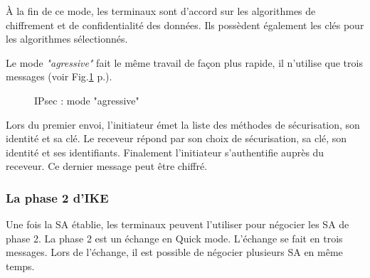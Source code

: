 À la fin de ce mode, les terminaux sont d'accord sur les algorithmes de chiffrement et de confidentialité des données. 
Ils possèdent également les clés pour les algorithmes sélectionnés. 

Le mode \textit{"agressive"} fait le même travail de façon plus rapide, il n'utilise que trois messages (voir Fig.\ref{fig:ipsagg} p.\pageref{fig:ipsagg}).
\begin{figure}[ht]
\centering
{}
\caption{IPsec : mode "agressive"}
\label{fig:ipsagg}
\end{figure} 
Lors du premier envoi, l'initiateur émet la liste des méthodes de sécurisation, son identité et sa clé. 
Le receveur répond par son choix de sécurisation, sa clé, son identité et ses identifiants. 
Finalement l'initiateur s'authentifie auprès du receveur. 
Ce dernier message peut être chiffré.
\subsubsection{La phase 2 d'IKE}
Une fois la SA établie, les terminaux peuvent l'utiliser pour négocier les SA de phase 2. 
La phase 2 est un échange en Quick mode. 
L'échange se fait en trois messages. 
Lors de l'échange, il est possible de négocier plusieurs SA en même temps. 